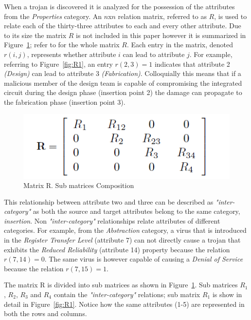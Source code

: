 When a trojan is discovered it is analyzed for the possession of the attributes from the \textit{Properties} category. An $n$x$n$ relation matrix, referred to as $R$, is used to relate each of the thirty-three attributes to each and every other attribute. Due to its size the matrix $R$ is not included in this paper however it is summarized in Figure~\ref{fig:R_short}; refer to \cite{SamerClassification} for the whole matrix $R$. Each entry in the matrix, denoted $r(i,j)$, represents whether attribute $i$ can lead to attribute $j$. For example, referring to Figure~\ref{fig:R1}, an entry $r(2,3) = 1$ indicates that attribute 2 \textit{(Design)} can lead to attribute 3 \textit{(Fabrication)}. Colloquially this means that if a malicious member of the design team is capable of compromising the integrated circuit during the design phase (insertion point 2) the damage can propagate to the fabrication phase (insertion point 3). 

\begin{figure}
	\centering
	\includegraphics[width=0.5\linewidth, scale=0.5]{figures/R_short}
	\caption[Matrix R. Sub matrices Composition]{Matrix R. Sub matrices Composition}
	\label{fig:R_short}
\end{figure}

This relationship between attribute two and three can be described as \textit{"inter-category"} as both the source and target attributes belong to the same category, \textit{insertion}. Non \textit{"inter-category"} relationships relate attributes of different categories. For example, from the \textit{Abstraction} category, a virus that is introduced in the \textit{Register Transfer Level} (attribute 7) can not directly cause a trojan that exhibits the \textit{Reduced Reliability} (attribute 14) property because the relation $r(7,14) = 0$. The same virus is however capable of causing a \textit{Denial of Service} because the relation $r(7,15) = 1$.

The matrix R is divided into sub matrices as shown in Figure~\ref{fig:R_short}. Sub matrices $R_{1}$, $R_{2}$, $R_{3}$ and $R_{4}$ contain the \textit{"inter-category"} relations; sub matrix $R_{1}$ is show in detail in Figure~\ref{fig:R1}. Notice how the same attributes (1-5) are represented in both the rows and columns. 


